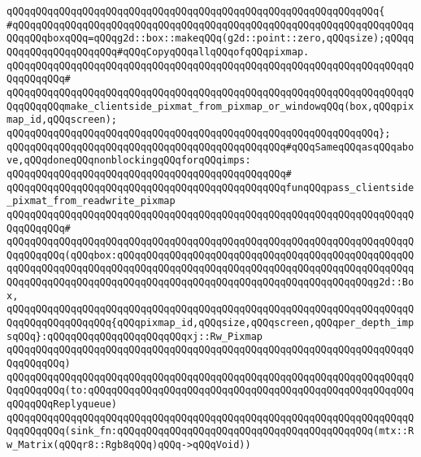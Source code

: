 \verb|qQQqqQQqqQQqqQQqqQQqqQQqqQQqqQQqqQQqqQQqqQQqqQQqqQQqqQQqqQQqqQQq{|\newline
\verb|#qQQqqQQqqQQqqQQqqQQqqQQqqQQqqQQqqQQqqQQqqQQqqQQqqQQqqQQqqQQqqQQqqQQqqQQqqQQqboxqQQq=qQQqg2d::box::makeqQQq(g2d::point::zero,qQQqsize);qQQqqQQqqQQqqQQqqQQqqQQq#qQQqCopyqQQqallqQQqofqQQqpixmap.|\newline
\verb|qQQqqQQqqQQqqQQqqQQqqQQqqQQqqQQqqQQqqQQqqQQqqQQqqQQqqQQqqQQqqQQqqQQqqQQqqQQqqQQq#|\newline
\verb|qQQqqQQqqQQqqQQqqQQqqQQqqQQqqQQqqQQqqQQqqQQqqQQqqQQqqQQqqQQqqQQqqQQqqQQqqQQqqQQqmake_clientside_pixmat_from_pixmap_or_windowqQQq(box,qQQqpixmap_id,qQQqscreen);|\newline
\verb|qQQqqQQqqQQqqQQqqQQqqQQqqQQqqQQqqQQqqQQqqQQqqQQqqQQqqQQqqQQqqQQq};|\newline
\newline
\verb|qQQqqQQqqQQqqQQqqQQqqQQqqQQqqQQqqQQqqQQqqQQqqQQq#qQQqSameqQQqasqQQqabove,qQQqdoneqQQqnonblockingqQQqforqQQqimps:|\newline
\verb|qQQqqQQqqQQqqQQqqQQqqQQqqQQqqQQqqQQqqQQqqQQqqQQq#|\newline
\verb|qQQqqQQqqQQqqQQqqQQqqQQqqQQqqQQqqQQqqQQqqQQqqQQqfunqQQqpass_clientside_pixmat_from_readwrite_pixmap|\newline
\verb|qQQqqQQqqQQqqQQqqQQqqQQqqQQqqQQqqQQqqQQqqQQqqQQqqQQqqQQqqQQqqQQqqQQqqQQqqQQqqQQq#|\newline
\verb|qQQqqQQqqQQqqQQqqQQqqQQqqQQqqQQqqQQqqQQqqQQqqQQqqQQqqQQqqQQqqQQqqQQqqQQqqQQqqQQq(qQQqbox:qQQqqQQqqQQqqQQqqQQqqQQqqQQqqQQqqQQqqQQqqQQqqQQqqQQqqQQqqQQqqQQqqQQqqQQqqQQqqQQqqQQqqQQqqQQqqQQqqQQqqQQqqQQqqQQqqQQqqQQqqQQqqQQqqQQqqQQqqQQqqQQqqQQqqQQqqQQqqQQqqQQqqQQqqQQqqQQqqQQqqQQqg2d::Box,|\newline
\verb|qQQqqQQqqQQqqQQqqQQqqQQqqQQqqQQqqQQqqQQqqQQqqQQqqQQqqQQqqQQqqQQqqQQqqQQqqQQqqQQqqQQqqQQq{qQQqpixmap_id,qQQqsize,qQQqscreen,qQQqper_depth_impsqQQq}:qQQqqQQqqQQqqQQqqQQqqQQqxj::Rw_Pixmap|\newline
\verb|qQQqqQQqqQQqqQQqqQQqqQQqqQQqqQQqqQQqqQQqqQQqqQQqqQQqqQQqqQQqqQQqqQQqqQQqqQQqqQQq)|\newline
\verb|qQQqqQQqqQQqqQQqqQQqqQQqqQQqqQQqqQQqqQQqqQQqqQQqqQQqqQQqqQQqqQQqqQQqqQQqqQQqqQQq(to:qQQqqQQqqQQqqQQqqQQqqQQqqQQqqQQqqQQqqQQqqQQqqQQqqQQqqQQqqQQqqQQqReplyqueue)|\newline
\verb|qQQqqQQqqQQqqQQqqQQqqQQqqQQqqQQqqQQqqQQqqQQqqQQqqQQqqQQqqQQqqQQqqQQqqQQqqQQqqQQq(sink_fn:qQQqqQQqqQQqqQQqqQQqqQQqqQQqqQQqqQQqqQQqqQQq(mtx::Rw_Matrix(qQQqr8::Rgb8qQQq)qQQq->qQQqVoid))|\newline
